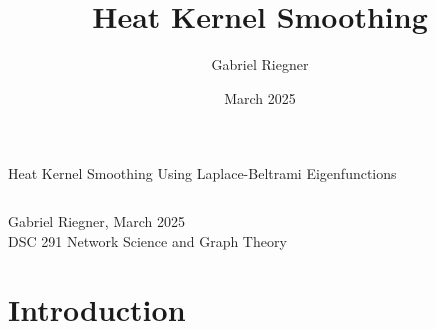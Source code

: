 \documentclass[8pt]{beamer}
\title{Heat Kernel Smoothing}
\author[]{Gabriel Riegner}
\date{March 2025}
\begin{document}
\begin{frame}{Heat Kernel Smoothing Using Laplace-Beltrami Eigenfunctions\\ \citep*{seo_heat_2010}}
\small
\begin{columns}
\tableofcontents[hideallsubsections]
\end{columns}
\vfill\centering
Gabriel Riegner, March 2025\\
DSC 291 Network Science and Graph Theory
\end{frame}


\section{Introduction}
\end{document}

